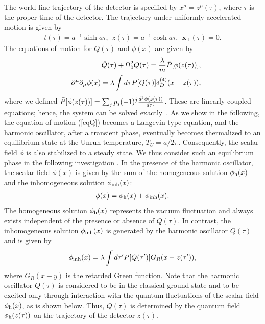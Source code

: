 \documentclass[aps,prd,preprintnumbers,nofootinbib,showpacs,11pt]{revtex4}%
\begin{document}
\begin{widetext}
The world-line trajectory of the detector is specified by
$x^\mu=z^\mu(\tau)$, where $\tau$ is the proper time of the detector. 
The trajectory under uniformly accelerated motion is given by 
\begin{eqnarray}
t(\tau)=a^{-1}\sinh a\tau, ~~z(\tau)=a^{-1}\cosh a\tau, ~~\bm x_\perp(\tau)=0.
\label{trajec}
\end{eqnarray} 
The equations of motion for $Q(\tau)$ and $\phi(x)$ are given by 
\begin{eqnarray}
&&\ddot Q(\tau)+\Omega_0^2Q(\tau)={\lambda\over m}\bar P[\phi(z(\tau))]
\label{eqQ}, \\
&&\partial^\mu \partial_\mu\phi(x)=\lambda\int d\tau P[Q(\tau)]\delta^{(4)}_D(x-z(\tau)),
\label{eqphiA}
\end{eqnarray}
where we defined $\bar P[\phi(z(\tau))]=\sum_jp_j(-1)^j{d^j \phi(z(\tau))\over d\tau^j}$.
These are linearly coupled equations; hence, the system
can be solved exactly~\cite{LH,LH2}. 
As we show in the following, the equation of motion (\ref{eqQ}) becomes a Langevin-type equation, 
and the harmonic oscillator, after a transient phase, 
 eventually becomes thermalized to an equilibrium state at the Unruh temperature,
$T_U=a/2\pi$. Consequently, the scalar field $\phi$ is also stabilized to a steady state.
We thus consider such an equilibrium phase in the following investigation \cite{IYZ,IYZ2013}.
In the presence of the harmonic oscillator, 
the scalar field $\phi(x)$ is given by the sum of the homogeneous solution $\phi_{\rm h}(x)$ and the 
inhomogeneous solution $\phi_{\rm inh}(x)$: 
\begin{eqnarray}
  \phi(x)=\phi_{\rm h}(x)+\phi_{\rm inh}(x) .
\label{phpinh}
\end{eqnarray}
The homogeneous solution $\phi_{\rm h}(x)$ represents the vacuum fluctuation and always exists independent of
the presence or absence of $Q(\tau)$.
In contrast, the inhomogeneous solution 
 $\phi_{\rm inh}(x)$ is generated by the harmonic oscillator $Q(\tau)$ and is given by
\begin{eqnarray}
\phi_{\rm inh}(x) =\lambda \int d\tau' P[Q(\tau')]G_R(x-z(\tau')), 
\label{phiQG}
\end{eqnarray}
where $G_R(x-y)$ is the retarded Green function. 
Note that the harmonic oscillator $Q(\tau)$ is considered to be in the classical ground state 
and to be excited only through interaction with the quantum fluctuations of the scalar field 
$\phi_{\rm h}(x)$, as is shown below. 
Thus, $Q(\tau)$ is determined by the quantum field $\phi_{\rm h}(z(\tau))$ 
on the trajectory of the detector 
$z(\tau)$. 


\end{widetext}
\end{document}

